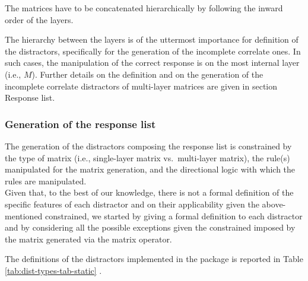 The matrices have to be concatenated hierarchically by following the inward order of the layers.

The hierarchy between the layers is of the uttermost importance for definition of the distractors, specifically for the generation of the incomplete correlate ones. In such cases, the manipulation of the correct response is on the most internal layer (i.e., \(M\)). Further details on the definition and on the generation of the incomplete correlate distractors of multi-layer matrices are given in section Response list.

\subsubsection{Generation of the response list}\label{generation-of-the-response-list}

The generation of the distractors composing the response list is constrained by the type of matrix (i.e., single-layer matrix vs.~multi-layer matrix), the rule(s) manipulated for the matrix generation, and the directional logic with which the rules are manipulated.\\
Given that, to the best of our knowledge, there is not a formal definition of the specific features of each distractor and on their applicability given the above-mentioned constrained, we started by giving a formal definition to each distractor and by considering all the possible exceptions given the constrained imposed by the matrix generated via the matrix operator.

The definitions of the distractors implemented in the  package is reported in Table \ref{tab:dist-types-tab-static} .

